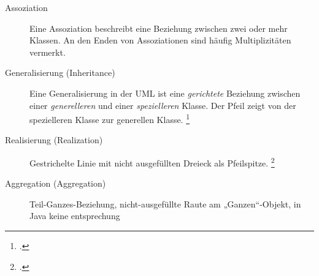 \documentclass{lehramt-informatik-haupt}
\begin{document}
\begin{description}
\item[Assoziation] Eine Assoziation beschreibt eine Beziehung zwischen
zwei oder mehr Klassen. An den Enden von Assoziationen sind häufig
Multiplizitäten vermerkt. 

\begin{center}
\end{center}

%

\item[Generalisierung (Inheritance)]

Eine Generalisierung in der UML ist
eine \emph{gerichtete} Beziehung zwischen einer \emph{generelleren} und
einer \emph{spezielleren} Klasse. Der Pfeil zeigt von der spezielleren
Klasse zur generellen Klasse.
\footcite[Kapitel 6.4.6 Generalisierung, Seite 135]{rupp}

\begin{center}
\end{center}

\item[Realisierung (Realization)] Gestrichelte Linie mit nicht
ausgefüllten Dreieck als Pfeilspitze. 
\footcite[Kapitel 6.4.13, Seite 164]{rupp}

\begin{center}
\end{center}

%

\item[Aggregation (Aggregation)]

Teil-Ganzes-Beziehung, nicht-ausgefüllte Raute am „Ganzen“-Objekt,
in Java keine entsprechung

\begin{center}
\end{center}


\end{description}
\end{document}
